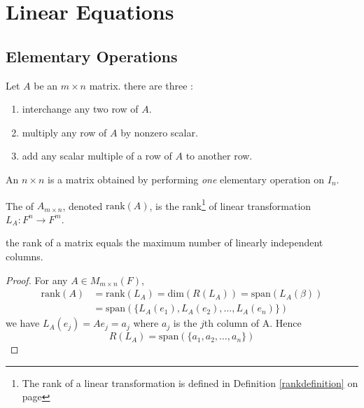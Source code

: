 \section{Linear Equations}

\subsection{Elementary Operations}

\begin{definition}
	Let $A$ be an $m\times n$ matrix. there are three :
	\begin{enumerate}
		\item interchange any two row of $A$.
		\item multiply any row of $A$ by nonzero scalar.
		\item add any scalar multiple of a row of $A$ to another row.
	\end{enumerate}
\end{definition}

\begin{definition}
	An $n\times n$  is a matrix obtained by performing \emph{one} elementary operation on $I_n$.
\end{definition}

\begin{definition}
	The  of $A_{m \times n}$, denoted $\text{rank}(A)$, is the rank\footnote{The rank of a linear transformation is defined in Definition \ref{rankdefinition} on page \pageref{rankdefinition}} of linear transformation $L_A: F^n \rightarrow F^m$.
\end{definition}

\begin{theorem}
	the rank of a matrix equals the maximum number of linearly independent columns.
\end{theorem}
\begin{proof}
	For any $A \in M_{m\times n}(F)$, 
	\begin{equation*}
		\begin{aligned}
			\text{rank}(A) &= \text{rank}(L_A) = \text{dim}(R(L_A)) = \text{span}(L_A(\beta)) \\
			&= \text{span}(\{ L_A(e_1), L_A(e_2), \dots, L_A(e_n) \})
		\end{aligned}
	\end{equation*}
	we have $L_A(e_j) = A e_j = a_j$ where $a_j$ is the $j$th column of A. Hence
	\begin{equation*}
		R(L_A) = \text{span}(\{ a_1, a_2, \dots, a_n \})
	\end{equation*}
\end{proof}

